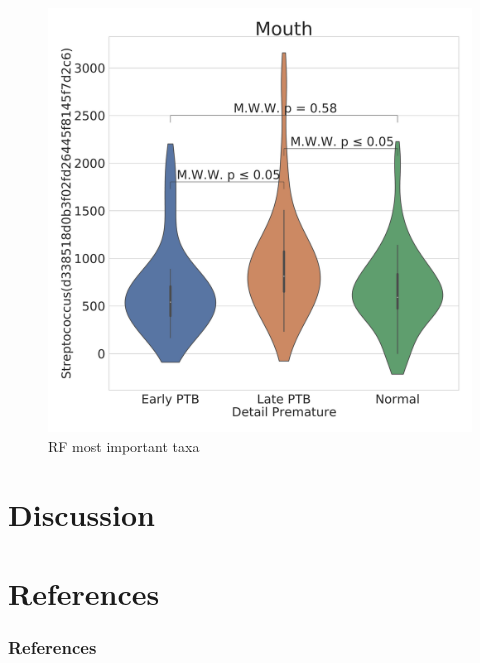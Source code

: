 \documentclass{beamer}
\begin{document}
\begin{frame}[allowframebreaks]
        \begin{figure}
            \includegraphics[width=0.5 \linewidth]{figures/RandomForest/RF.DADA2.homd/Mouth+Violin_0.pdf}
            \caption{RF most important taxa}
        \end{figure}
    \end{frame}

    \section{Discussion}

    \section{References}
   	\begin{frame}[allowframebreaks]
        \frametitle{References}
        
        
    \end{frame}
\end{document}
